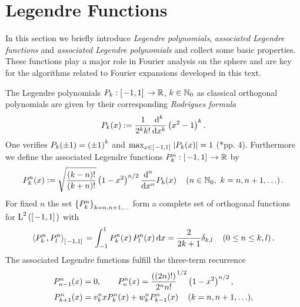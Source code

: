 \section{Legendre Functions}
\label{Basics:LegendreTypeFunctions}
In this section we briefly introduce \emph{Legendre polynomials}, \emph{associated Legendre functions} 
and \emph{associated Legendre polynomials} and collect some basic properties. These functions play 
a major role in Fourier analysis on the sphere and are key for the algorithms related to Fourier 
expansions developed in this text.

The Legendre polynomials $P_k : \left[\left.-1,1\right]\right. \rightarrow \mathbb{R}$, $k \in \mathbb{N}_{0}$ 
as classical orthogonal polynomials are given by their corresponding 
\emph{Rodrigues formula}
\begin{equation}
  \nonumber
  P_k{\hspace{-0.4ex}}\left(x\right) := \frac{1}{2^k k!} \frac{\text{\rm{d}}^k}{\text{\rm{d}} x^k} \left(x^2-1\right)^k.
\end{equation}
One verifies $P_{k}{\hspace{-0.4ex}}\left(\pm1\right) = \left(\pm1\right)^{k}$ and $\max_{x \in \left[\left.-1,1\right]\right.} \left\vert P_{k}{\hspace{-0.4ex}}\left(x\right)\right\vert = 1$ (\cite{niuv}*{pp. 4}).
Furthermore we define the associated Legendre functions $P_k^n : \left[\left.-1,1\right]\right. \rightarrow \mathbb{R}$ by
\begin{equation}
  \nonumber
  P_k^n{\hspace{-0.4ex}}\left(x\right) := \sqrt{\frac{\left(k-n\right)!}{\left(k+n\right)!}}
  \left(1-x^2\right)^{n/2} \frac{\text{\rm{d}}^n}{\text{\rm{d}} x^n} P_k{\hspace{-0.4ex}}\left(x\right) \quad \left(n \in \mathbb{N}_{0},\ k=n,n+1,\ldots\right).
\end{equation}
For fixed $n$ the set $\left\{P_{k}^n\right\rbrace_{k=n,n+1,\ldots}$ form a complete set of orthogonal functions 
for $\text{\rm{L}}^{2}\left(\left[\left.-1,1\right]\right.\right)$ with
$$ \left<P_{k}^n,P_{l}^n\right>_{\left[\left.-1,1\right]\right.} = \int_{-1}^{1} P_{k}^n{\hspace{-0.4ex}}\left(x\right) P_{l}^n{\hspace{-0.4ex}}\left(x\right) \text{\rm{d}} x = \frac{2}{2k+1} \delta_{k,l} \quad \left(0 \le n \le k,l\right).$$
The associated Legendre functions fulfill the three-term recurrence
\begin{equation}
  \label{Basics:AssociatedLegendreDefinition}
  \begin{split}
    P_{n-1}^n{\hspace{-0.4ex}}\left(x\right) & = 0,\qquad P_{n}^n{\hspace{-0.4ex}}\left(x\right) = \frac{((2n)!)}{2^n n!}^{1/2} \left(1-x^2\right)^{n/2},\\
    P_{k+1}^n{\hspace{-0.4ex}}\left(x\right) & = v_{k}^n x P_{k}^n{\hspace{-0.4ex}}\left(x\right) + w_{k}^n P_{k-1}^n{\hspace{-0.4ex}}\left(x\right) \quad (k = n,n+1,\ldots),
  \end{split}
\end{equation}
